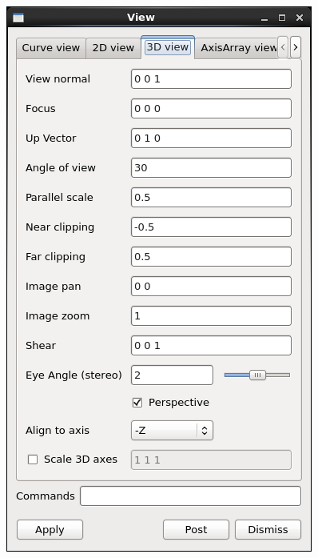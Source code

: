 \begin{frame}
\begin{columns}[T]
\begin{column}{3cm}
	\includegraphics[width=.9\columnwidth]{figs/visit-guis/visit_view3d}
\end{column}
\begin{column}{3cm}

\end{column}
\end{columns}
\end{frame}
